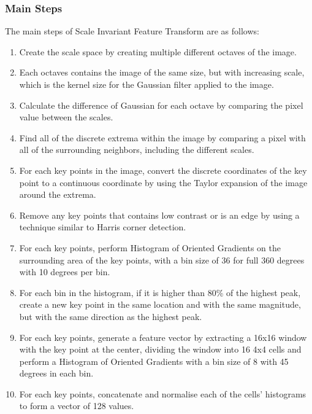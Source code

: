 \documentclass[conference]{IEEEtran}
\begin{document}
\subsubsection{Main Steps}
The main steps of Scale Invariant Feature Transform are as
follows\cite{sift-1}\cite{sift-2}:
\begin{enumerate}
    \item Create the scale space by creating multiple different octaves of the
          image.
    \item Each octaves contains the image of the same size, but with increasing
          scale, which is the kernel size for the Gaussian filter applied to the
          image.
    \item Calculate the difference of Gaussian for each octave by comparing the
          pixel value between the scales.
    \item Find all of the discrete extrema within the image by comparing a
          pixel with all of the surrounding neighbors, including the different
          scales.
    \item For each key points in the image, convert the discrete coordinates of
          the key point to a continuous coordinate by using the Taylor
          expansion of the image around the extrema.
    \item Remove any key points that contains low contrast or is an edge by
          using a technique similar to Harris corner detection.
    \item For each key points, perform Histogram of Oriented Gradients on the
          surrounding area of the key points, with a bin size of 36 for full
          360 degrees with 10 degrees per bin.
    \item For each bin in the histogram, if it is higher than 80\% of the
          highest peak, create a new key point in the same location and with the
          same magnitude, but with the same direction as the highest peak.
    \item For each key points, generate a feature vector by extracting a 16x16
          window with the key point at the center, dividing the window into 16
          4x4 cells and perform a Histogram of Oriented Gradients with a bin
          size of 8 with 45 degrees in each bin.
    \item For each key points, concatenate and normalise each of the cells'
          histograms to form a vector of 128 values.
\end{enumerate}


%
\end{document}

